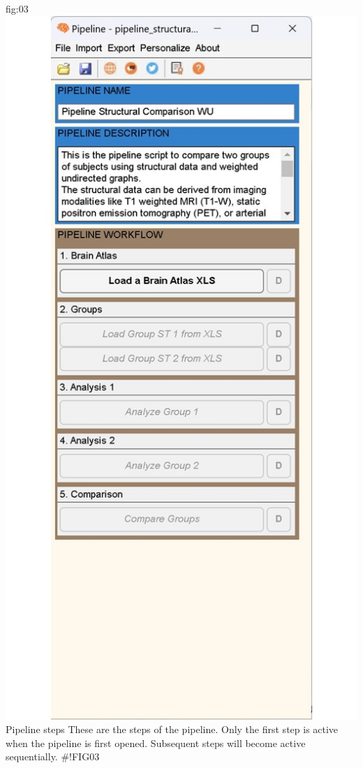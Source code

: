 \documentclass[justified]{tufte-handout}
\begin{document}
{fig:03}
{\includegraphics{fig03.jpg}
}
{Pipeline steps}
{
These are the steps of the pipeline. Only the first step is active when the pipeline is first opened. Subsequent steps will become active sequentially.
}
#!FIG03
\clearpage
\end{document}
